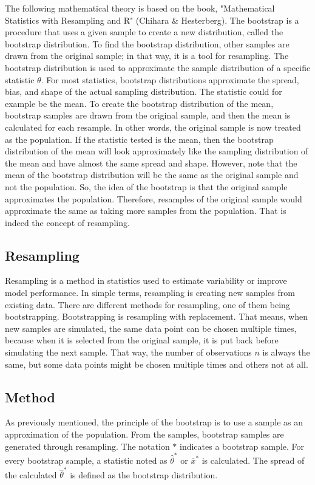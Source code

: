 
The following mathematical theory is based on the book, "Mathematical Statistics with Resampling and R" (Chihara \& Hesterberg). The bootstrap is a procedure that uses a given sample to create a new distribution, called the bootstrap distribution. To find the bootstrap distribution, other samples are drawn from the original sample; in that way, it is a tool for resampling. The bootstrap distribution is used to approximate the sample distribution of a specific statistic $\theta$. For most statistics, bootstrap distributions approximate the spread, bias, and shape of the actual sampling distribution. The statistic could for example be the mean. To create the bootstrap distribution of the mean, bootstrap samples are drawn from the original sample, and then the mean is calculated for each resample. In other words, the original sample is now treated as the population. If the statistic tested is the mean, then the bootstrap distribution of the mean will look approximately like the sampling distribution of the mean and have almost the same spread and shape. However, note that the mean of the bootstrap distribution will be the same as the original sample and not the population. \newline
So, the idea of the bootstrap is that the original sample approximates the population. Therefore, resamples of the original sample would approximate the same as taking more samples from the population. That is indeed the concept of resampling.

\subsection{Resampling}
Resampling is a method in statistics used to estimate variability or improve model performance. In simple terms, resampling is creating new samples from existing data. There are different methods for resampling, one of them being bootstrapping. Bootstrapping is resampling with replacement. That means, when new samples are simulated, the same  data point can be chosen multiple times, because when it is selected from the original sample, it is put back before simulating the next sample. That way, the number of observations $n$ is always the same, but some data points might be chosen multiple times and others not at all.

\subsection{Method}
As previously mentioned, the principle of the bootstrap is to use a sample as an approximation of the population. From the samples, bootstrap samples are generated through resampling. The notation $*$ indicates a bootstrap sample. For every bootstrap sample, a statistic noted as $\hat{\theta}^*$ or $\overline{x}^*$ is calculated. The spread of the calculated $\hat{\theta}^*$ is defined as the bootstrap distribution.\newline

